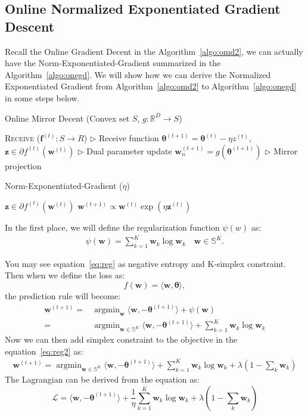 \documentclass[11pt]{article}
\DeclareMathOperator*{\argmin}{argmin}
\newcommand{\btheta}{\boldsymbol{\theta}}
\newcommand{\bz}{\boldsymbol{z}}
\newcommand{\bw}{\boldsymbol{w}}
\begin{document}
\subsection{Online Normalized Exponentiated
Gradient Descent}

Recall the Online Gradient Decent in the Algorithm~\ref{algo:omd2}, we can actually have the Norm-Exponentiated-Gradient summarized in the Algorithm~\ref{algo:onegd}. We will show how we can derive the Normalized Exponentiated Gradient from Algorithm~\ref{algo:omd2} to Algorithm~\ref{algo:onegd} in some steps below.

\begin{algorithm}[H]
\caption{Online Mirror Decent (Convex set $S$, $g: \mathbb{R}^D \rightarrow S$)}
\label{algo:omd2}
\begin{algorithmic}[1]
%
\STATE \textsc{Receive} ($\pmb{f}^{(t)}: S \rightarrow R$) \hfill $\triangleright$ Receive function
%
\STATE $\btheta^{(t+1)} =  \btheta^{(t)} - \eta z ^{(t)}$, $\bz \in \partial f^{(t)}(\bw^{(t)})$ \hfill $\triangleright$ Dual parameter update
%
\STATE $\bw_n^{(t+1)} =  g\left(\btheta^{(t+1)}\right)$ \hfill $\triangleright$ Mirror projection
%
\ENDFOR
\end{algorithmic}
\end{algorithm}


\begin{algorithm}[H]
\caption{Norm-Exponentiated-Gradient ($\eta$)}
\label{algo:onegd}
\begin{algorithmic}[1]
%
\STATE $\bz \in \partial f^{(t)}(\bw^{(t)})$ 
%
\STATE $\bw^{(t+1)} \propto \bw^{(t)} \exp{(\eta \bz^{(t)})}$ 
%
\ENDFOR
\end{algorithmic}
\end{algorithm}

In the first place, we will define the regularization function $\psi (w)$ as:
\begin{align}\label{eq:reg}
    \psi (\bw) = \sum_{k=1}^{K} \bw_k \log \bw_k \quad \bw\in \mathbb{S}^K.
\end{align}

You may see equation~\ref{eq:reg} as negative entropy and K-simplex constraint. Then when we define the loss as:
$$f(\bw) = \langle \bw, \btheta\rangle,$$
the prediction rule will become:
\begin{align}\label{eq:reg2}
    \bw^{(t+1)} = & \argmin_{\bw} \langle \bw, -\btheta^{(t+1)} \rangle + \psi (\bw)\nonumber \\
    = & \argmin_{\bw \in \mathbb{S}^K} \langle \bw, -\btheta^{(t+1)} \rangle + \sum_{k=1}^{K} \bw_k \log \bw_k
\end{align}
Now we can then add simplex constraint to the objective in the equation~\ref{eq:reg2} as:
\begin{align}
    \bw^{(t+1)} = \argmin_{\bw \in \mathbb{S}^K} \langle \bw, -\btheta^{(t+1)} \rangle + \sum_{k=1}^{K} \bw_k \log \bw_k + \lambda \left( 1- \sum_k \bw_k\right)
\end{align}
The Lagrangian can be derived from the equation as:
$$ \mathcal{L} = \langle \bw, -\btheta^{(t+1)} \rangle + \frac{1}{\eta}\sum_{k=1}^{K} \bw_k \log \bw_k + \lambda \left( 1- \sum_k \bw_k\right)$$
\end{document}
